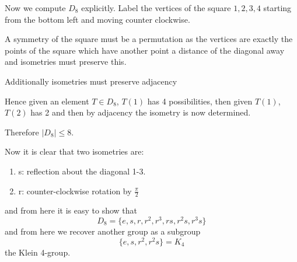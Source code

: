 \documentclass[12pt]{article}
\begin{document}
\begin{example}
    Now we compute $D_8$ explicitly. Label the vertices of the square $1, 2, 3, 4$ starting from the bottom left and moving counter clockwise.

    A symmetry of the square must be a permutation as the vertices are exactly the points of the square
    which have another point a distance of the diagonal away and isometries must preserve this.

    Additionally isometries must preserve adjacency

    Hence given an element $T \in D_8$, $T(1)$ has 4 possibilities,
    then given $T(1)$, $T(2)$ has 2 and then by adjacency the isometry is now determined.

    Therefore $|D_8| \leq 8$.

    Now it is clear that two isometries are:
    \begin{enumerate}
        \item s: reflection about the diagonal 1-3.
        \item r: counter-clockwise rotation by $\frac{\pi}{2}$
    \end{enumerate}
    and from here it is easy to show that
    \[ D_8 = \{ e, s, r, r^2, r^3, rs, r^2s, r^3s \} \]
    and from here we recover another group as a subgroup
    \[ \{ e, s, r^2, r^2s \} = K_4 \]
    the Klein 4-group.
\end{example}
\end{document}
